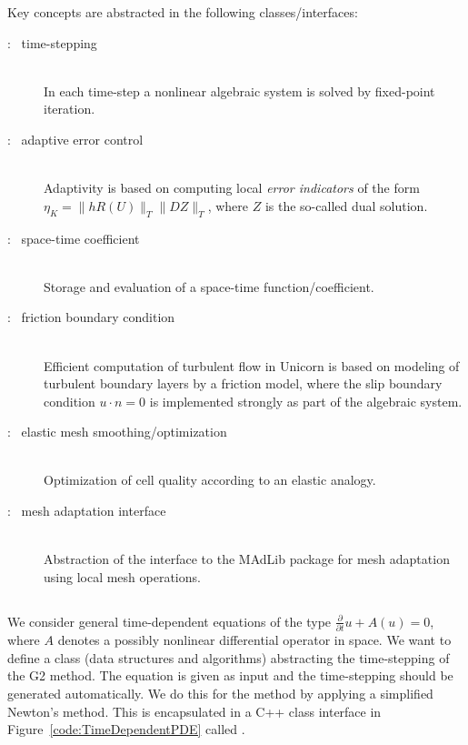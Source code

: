 Key concepts are abstracted in the following classes/interfaces:
\begin{description}
\item[: \ time-stepping]
\ \\
In each time-step a nonlinear algebraic system is solved by
fixed-point iteration.
\item[: \ adaptive error control] \ \\ Adaptivity
  is based on computing local {\em error indicators} of the
  form $\eta_K = \|h R(U)\|_T \|D Z\|_T$, where $Z$ is the so-called
  dual solution.

\item[: \ space-time coefficient]
\ \\
Storage and evaluation of a space-time function/coefficient.
\item[: \ friction boundary condition] \ \\ Efficient
  computation of turbulent flow in Unicorn is based on modeling of
  turbulent boundary layers by a friction model, where the slip
  boundary condition $u \cdot n = 0$ is implemented strongly as part
  of the algebraic system.
\item[: \ elastic mesh smoothing/optimization]
\ \\
Optimization of cell quality according to an elastic analogy.
\item[: \ mesh adaptation interface]
\ \\
Abstraction of the interface to the MAdLib package for mesh adaptation
using local mesh operations.
\end{description}

\subsection{}

We consider general time-dependent equations of the type
$\frac{\partial}{\partial t} u + A(u) = 0$, where $A$ denotes a
possibly nonlinear differential operator in space. We want to define a
class (data structures and algorithms) abstracting the time-stepping
of the G2 method. The equation is given as input and the time-stepping
should be generated automatically. We do this for the \cgone{}\cgone{}
method by applying a simplified Newton's method. This is encapsulated
in a C++ class interface in
Figure~\ref{code:TimeDependentPDE} called .

